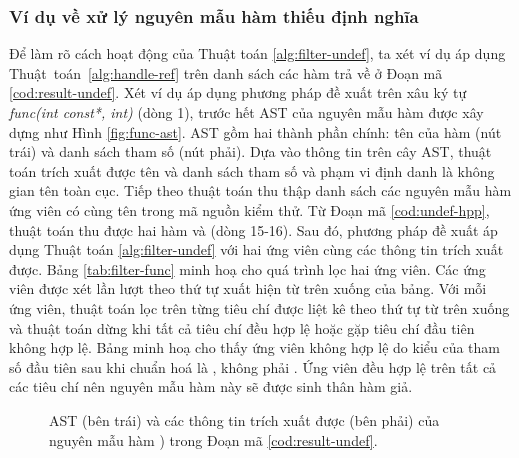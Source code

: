 \subsubsection*{Ví dụ về xử lý nguyên mẫu hàm thiếu định nghĩa}
Để làm rõ cách hoạt động của Thuật toán \autoref{alg:filter-undef}, ta xét ví dụ áp dụng Thuật~toán~\autoref{alg:handle-ref} trên danh sách các hàm trả về ở Đoạn mã \autoref{cod:result-undef}. Xét ví dụ áp dụng phương pháp đề xuất trên xâu ký tự \textit{func(int const*, int)} (dòng 1), trước hết AST của nguyên mẫu hàm được xây dựng như Hình \autoref{fig:func-ast}. AST gồm hai thành phần chính: tên của hàm (nút trái) và danh sách tham số (nút phải). Dựa vào thông tin trên cây AST, thuật toán trích xuất được tên  và danh sách tham số  và phạm vi định danh là không gian tên toàn cục. Tiếp theo thuật toán thu thập danh sách các nguyên mẫu hàm ứng viên có cùng tên  trong mã nguồn kiểm thử. Từ Đoạn mã \autoref{cod:undef-hpp}, thuật toán thu được hai hàm  và  (dòng 15-16). Sau đó, phương pháp đề xuất áp dụng Thuật toán \autoref{alg:filter-undef} với hai ứng viên cùng các thông tin trích xuất được. Bảng \autoref{tab:filter-func} minh hoạ cho quá trình lọc hai ứng viên. Các ứng viên được xét lần lượt theo thứ tự xuất hiện từ trên xuống của bảng. Với mỗi ứng viên, thuật toán lọc trên từng tiêu chí được liệt kê theo thứ tự từ trên xuống và thuật toán dừng khi tất cả tiêu chí đều hợp lệ hoặc gặp tiêu chí đầu tiên không hợp lệ. Bảng minh hoạ cho thấy ứng viên  không hợp lệ do kiểu của tham số đầu tiên sau khi chuẩn hoá là , không phải . Ứng viên  đều hợp lệ trên tất cả các tiêu chí nên nguyên mẫu hàm này sẽ được sinh thân hàm giả. \\
\begin{figure}[h]
    \centering
    
    \caption{AST (bên trái) và các thông tin trích xuất được (bên phải) của nguyên mẫu hàm ) trong Đoạn mã \autoref{cod:result-undef}.}
    \label{fig:func-ast}
\end{figure}

